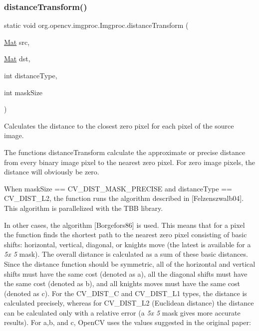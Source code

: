 \subsubsection{\texorpdfstring{distance\+Transform()}{distanceTransform()}}
{\footnotesize\ttfamily static void org.\+opencv.\+imgproc.\+Imgproc.\+distance\+Transform (\begin{DoxyParamCaption}\item[{\mbox{\hyperlink{classorg_1_1opencv_1_1core_1_1_mat}{Mat}}}]{src,  }\item[{\mbox{\hyperlink{classorg_1_1opencv_1_1core_1_1_mat}{Mat}}}]{dst,  }\item[{int}]{distance\+Type,  }\item[{int}]{mask\+Size }\end{DoxyParamCaption})\hspace{0.3cm}{\ttfamily [static]}}

Calculates the distance to the closest zero pixel for each pixel of the source image.

The functions {\ttfamily distance\+Transform} calculate the approximate or precise distance from every binary image pixel to the nearest zero pixel. For zero image pixels, the distance will obviously be zero.

When {\ttfamily mask\+Size == C\+V\+\_\+\+D\+I\+S\+T\+\_\+\+M\+A\+S\+K\+\_\+\+P\+R\+E\+C\+I\+SE} and {\ttfamily distance\+Type == C\+V\+\_\+\+D\+I\+S\+T\+\_\+\+L2}, the function runs the algorithm described in \mbox{[}Felzenszwalb04\mbox{]}. This algorithm is parallelized with the T\+BB library.

In other cases, the algorithm \mbox{[}Borgefors86\mbox{]} is used. This means that for a pixel the function finds the shortest path to the nearest zero pixel consisting of basic shifts\+: horizontal, vertical, diagonal, or knight\textquotesingle{}s move (the latest is available for a {\itshape 5x 5} mask). The overall distance is calculated as a sum of these basic distances. Since the distance function should be symmetric, all of the horizontal and vertical shifts must have the same cost (denoted as {\ttfamily a}), all the diagonal shifts must have the same cost (denoted as {\ttfamily b}), and all knight\textquotesingle{}s moves must have the same cost (denoted as {\ttfamily c}). For the {\ttfamily C\+V\+\_\+\+D\+I\+S\+T\+\_\+C} and {\ttfamily C\+V\+\_\+\+D\+I\+S\+T\+\_\+\+L1} types, the distance is calculated precisely, whereas for {\ttfamily C\+V\+\_\+\+D\+I\+S\+T\+\_\+\+L2} (Euclidean distance) the distance can be calculated only with a relative error (a {\itshape 5x 5} mask gives more accurate results). For {\ttfamily a},{\ttfamily b}, and {\ttfamily c}, Open\+CV uses the values suggested in the original paper\+:

